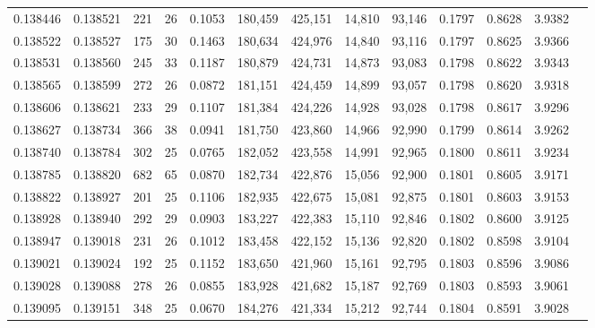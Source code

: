 \begin{tabular}{rrrrrrrrrrrrr}
0.138446 & 0.138521 &   221 &  26 &                                     0.1053 & 180,459 & 425,151 &  14,810 &  93,146 & 0.1797 & 0.8628 & 3.9382 \\
0.138522 & 0.138527 &   175 &  30 &                                     0.1463 & 180,634 & 424,976 &  14,840 &  93,116 & 0.1797 & 0.8625 & 3.9366 \\
0.138531 & 0.138560 &   245 &  33 &                                     0.1187 & 180,879 & 424,731 &  14,873 &  93,083 & 0.1798 & 0.8622 & 3.9343 \\
0.138565 & 0.138599 &   272 &  26 &                                     0.0872 & 181,151 & 424,459 &  14,899 &  93,057 & 0.1798 & 0.8620 & 3.9318 \\
0.138606 & 0.138621 &   233 &  29 &                                     0.1107 & 181,384 & 424,226 &  14,928 &  93,028 & 0.1798 & 0.8617 & 3.9296 \\
0.138627 & 0.138734 &   366 &  38 &                                     0.0941 & 181,750 & 423,860 &  14,966 &  92,990 & 0.1799 & 0.8614 & 3.9262 \\
0.138740 & 0.138784 &   302 &  25 &                                     0.0765 & 182,052 & 423,558 &  14,991 &  92,965 & 0.1800 & 0.8611 & 3.9234 \\
0.138785 & 0.138820 &   682 &  65 &                                     0.0870 & 182,734 & 422,876 &  15,056 &  92,900 & 0.1801 & 0.8605 & 3.9171 \\
0.138822 & 0.138927 &   201 &  25 &                                     0.1106 & 182,935 & 422,675 &  15,081 &  92,875 & 0.1801 & 0.8603 & 3.9153 \\
0.138928 & 0.138940 &   292 &  29 &                                     0.0903 & 183,227 & 422,383 &  15,110 &  92,846 & 0.1802 & 0.8600 & 3.9125 \\
0.138947 & 0.139018 &   231 &  26 &                                     0.1012 & 183,458 & 422,152 &  15,136 &  92,820 & 0.1802 & 0.8598 & 3.9104 \\
0.139021 & 0.139024 &   192 &  25 &                                     0.1152 & 183,650 & 421,960 &  15,161 &  92,795 & 0.1803 & 0.8596 & 3.9086 \\
0.139028 & 0.139088 &   278 &  26 &                                     0.0855 & 183,928 & 421,682 &  15,187 &  92,769 & 0.1803 & 0.8593 & 3.9061 \\
0.139095 & 0.139151 &   348 &  25 &                                     0.0670 & 184,276 & 421,334 &  15,212 &  92,744 & 0.1804 & 0.8591 & 3.9028 \\

\end{tabular}
